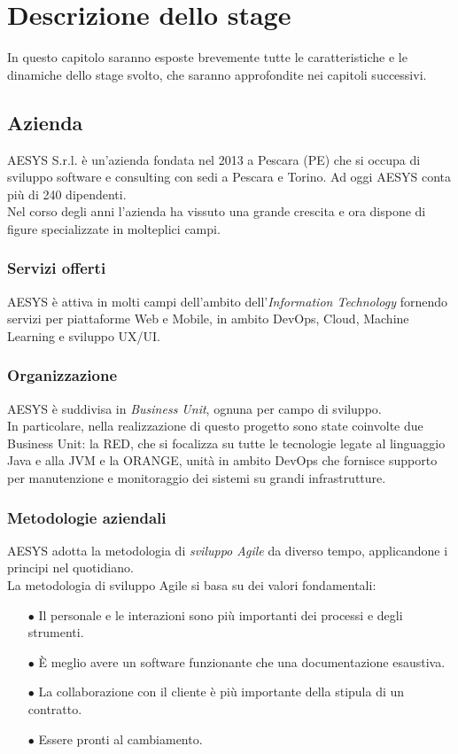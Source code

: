 \chapter{Descrizione dello stage}\label{chapter:descrizione}
In questo capitolo saranno esposte brevemente tutte le caratteristiche e le dinamiche dello stage svolto, che saranno approfondite nei capitoli successivi.

\section{Azienda}\label{sec:azienda}
AESYS S.r.l. è un’azienda fondata nel 2013 a Pescara (PE) che si occupa di sviluppo software e consulting con sedi a Pescara e Torino. Ad oggi AESYS conta più di 240 dipendenti.\\
Nel corso degli anni l’azienda ha vissuto una grande crescita e ora dispone di figure specializzate in molteplici campi.\\

\subsection{Servizi offerti}\label{sec:serviziofferti}
AESYS è attiva in molti campi dell’ambito dell’\emph{Information Technology} fornendo servizi per piattaforme Web e Mobile, in ambito DevOps, Cloud, Machine Learning e sviluppo UX/UI.

\subsection{Organizzazione}\label{sec:organizzazione}
AESYS è suddivisa in \emph{Business Unit}, ognuna per campo di sviluppo.\\
In particolare, nella realizzazione di questo progetto sono state coinvolte due Business Unit: la RED, che si focalizza su tutte le tecnologie legate al linguaggio Java e alla JVM e la ORANGE, unità in ambito DevOps che fornisce supporto per manutenzione e monitoraggio dei sistemi su grandi infrastrutture.

\subsection{Metodologie aziendali}\label{sec:metodologieaziendali}
AESYS adotta la metodologia di \emph{sviluppo Agile} da diverso tempo, applicandone i principi nel quotidiano.\\
La metodologia di sviluppo Agile si basa su dei valori fondamentali:
\begin{itemize}
	\item[$\bullet$]Il personale e le interazioni sono più importanti dei processi e degli strumenti.
	\item[$\bullet$]È meglio avere un software funzionante che una documentazione esaustiva.
	\item[$\bullet$]La collaborazione con il cliente è più importante della stipula di un contratto.
	\item[$\bullet$]Essere pronti al cambiamento.
\end{itemize}

